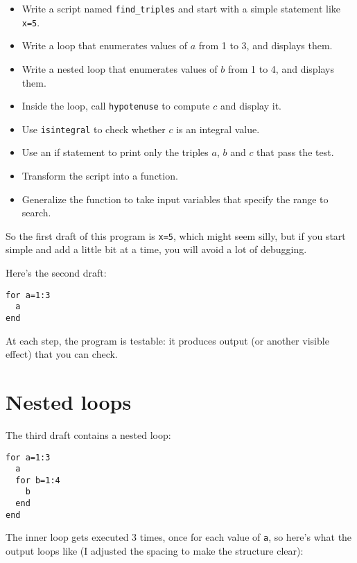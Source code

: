 \begin{itemize}

\item Write a script named {\tt find\_triples} and start with a simple
statement like {\tt x=5}.

\item Write a loop that enumerates values of $a$ from 1 to 3, and
displays them.

\item Write a nested loop that enumerates values of $b$ from 1 to 4,
and displays them.

\item Inside the loop, call {\tt hypotenuse} to compute $c$ and
display it.

\item Use {\tt isintegral} to check whether $c$ is an integral
value.

\item Use an if statement to print only the triples $a$, $b$ and $c$
that pass the test.

\item Transform the script into a function.

\item Generalize the function to take input variables that
specify the range to search.

\end{itemize}

So the first draft of this program is {\tt x=5}, which might seem
silly, but if you start simple and add a little bit at a time, you
will avoid a lot of debugging.

Here's the second draft:

\begin{verbatim}
for a=1:3
  a
end
\end{verbatim}

At each step, the program is testable: it produces output (or another
visible effect) that you can check.


\section{Nested loops}

The third draft contains a nested loop:

\begin{verbatim}
for a=1:3
  a
  for b=1:4
    b
  end
end
\end{verbatim}

The inner loop gets executed 3 times, once for each value of {\tt a},
so here's what the output loops like (I adjusted the spacing to make
the structure clear):

